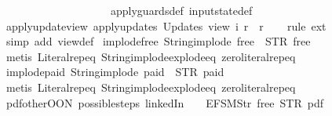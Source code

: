 \begin{isabellebody}
\ \ \ \ \ \ \ \ \ \ \ \ \ \ \ \ \ \ \ \ apply{\isacharunderscore}guards{\isacharunderscore}def\ input{}state{\isacharunderscore}def{\isacharparenright}%
\endisatagproof
{\isafoldproof}%
%
\isadelimproof
\isanewline
%
\endisadelimproof
\isanewline
{}\isamarkupfalse%
\ apply{\isacharunderscore}update{\isacharunderscore}view{}{\isacharcolon}\ {\isachardoublequoteopen}apply{\isacharunderscore}updates\ {\isacharparenleft}Updates\ view{}{\isacharparenright}\ i\ r\ {\isacharequal}\ r{\isachardoublequoteclose}\isanewline
%
\isadelimproof
\ \ %
\endisadelimproof
%
\isatagproof
{}\isamarkupfalse%
\ {\isacharparenleft}rule\ ext{\isacharparenright}\isanewline
\ \ \isamarkupfalse%
\ {\isacharparenleft}simp\ add{\isacharcolon}\ view{}{\isacharunderscore}def{\isacharparenright}%
\endisatagproof
{\isafoldproof}%
%
\isadelimproof
\isanewline
%
\endisadelimproof
\isanewline
{}\isamarkupfalse%
\ implode{\isacharunderscore}free{\isacharcolon}\ {\isachardoublequoteopen}String{\isachardot}implode\ {\isacharprime}{\isacharprime}free{\isacharprime}{\isacharprime}\ {\isacharequal}\ STR\ {\isacharprime}{\isacharprime}free{\isacharprime}{\isacharprime}{\isachardoublequoteclose}\isanewline
%
\isadelimproof
\ \ %
\endisadelimproof
%
\isatagproof
{}\isamarkupfalse%
\ {\isacharparenleft}metis\ Literal{\isachardot}rep{\isacharunderscore}eq\ String{\isachardot}implode{\isacharunderscore}explode{\isacharunderscore}eq\ zero{\isacharunderscore}literal{\isachardot}rep{\isacharunderscore}eq{\isacharparenright}%
\endisatagproof
{\isafoldproof}%
%
\isadelimproof
\isanewline
%
\endisadelimproof
\isanewline
{}\isamarkupfalse%
\ implode{\isacharunderscore}paid{\isacharcolon}\ {\isachardoublequoteopen}String{\isachardot}implode\ {\isacharprime}{\isacharprime}paid{\isacharprime}{\isacharprime}\ {\isacharequal}\ STR\ {\isacharprime}{\isacharprime}paid{\isacharprime}{\isacharprime}{\isachardoublequoteclose}\isanewline
%
\isadelimproof
\ \ %
\endisadelimproof
%
\isatagproof
{}\isamarkupfalse%
\ {\isacharparenleft}metis\ Literal{\isachardot}rep{\isacharunderscore}eq\ String{\isachardot}implode{\isacharunderscore}explode{\isacharunderscore}eq\ zero{\isacharunderscore}literal{\isachardot}rep{\isacharunderscore}eq{\isacharparenright}%
\endisatagproof
{\isafoldproof}%
%
\isadelimproof
\isanewline
%
\endisadelimproof
\isanewline
{}\isamarkupfalse%
\ pdf{\isacharunderscore}other{\isacharunderscore}OON{\isacharcolon}\ {\isachardoublequoteopen}possible{\isacharunderscore}steps\ linkedIn\ {}\ {\isacharless}{}\ {\isacharcolon}{\isacharequal}\ EFSM{\isachardot}Str\ {\isacharprime}{\isacharprime}free{\isacharprime}{\isacharprime}{\isachargreater}\ STR\ {\isacharprime}{\isacharprime}pdf{\isacharprime}{\isacharprime}\isanewline

\end{isabellebody}
